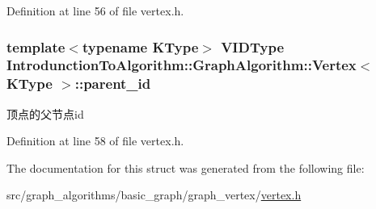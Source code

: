 Definition at line 56 of file vertex.\+h.

\hypertarget{struct_introdunction_to_algorithm_1_1_graph_algorithm_1_1_vertex_ac812f623d4955401f9e2c8f45b4d434d}{}
\subsubsection[{parent\+\_\+id}]{\setlength{\rightskip}{0pt plus 5cm}template$<$typename K\+Type$>$ {\bf V\+I\+D\+Type} {\bf Introdunction\+To\+Algorithm\+::\+Graph\+Algorithm\+::\+Vertex}$<$ K\+Type $>$\+::parent\+\_\+id}\label{struct_introdunction_to_algorithm_1_1_graph_algorithm_1_1_vertex_ac812f623d4955401f9e2c8f45b4d434d}
顶点的父节点id 

Definition at line 58 of file vertex.\+h.



The documentation for this struct was generated from the following file\+:\begin{DoxyCompactItemize}
\item 
src/graph\+\_\+algorithms/basic\+\_\+graph/graph\+\_\+vertex/\hyperlink{vertex_8h}{vertex.\+h}\end{DoxyCompactItemize}
